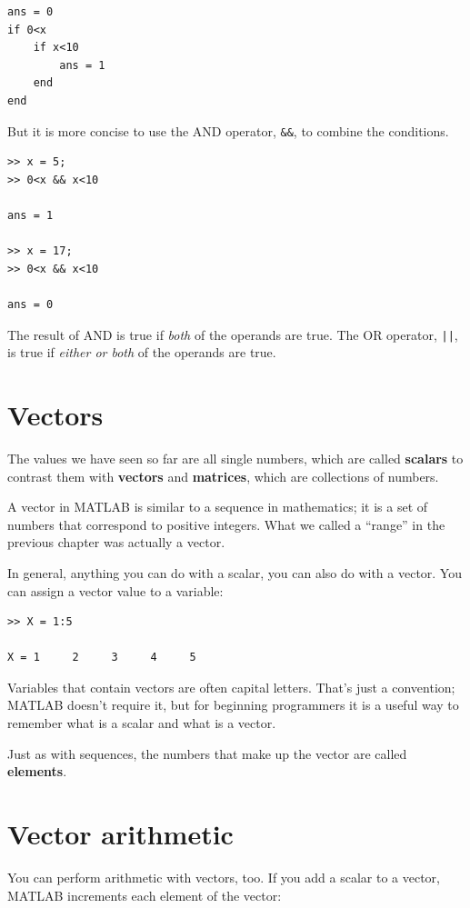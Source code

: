 \documentclass{book}
\begin{document}
\begin{verbatim}
ans = 0
if 0<x
    if x<10
        ans = 1
    end
end
\end{verbatim}

But it is more concise to use the AND operator, {\tt \&\&}, to
combine the conditions.

\begin{verbatim}
>> x = 5;
>> 0<x && x<10

ans = 1

>> x = 17;
>> 0<x && x<10

ans = 0
\end{verbatim}

The result of AND is true if {\em both} of the operands are
true.  The OR operator, {\tt ||}, is true if {\em either or both}
of the operands are true.


\section{Vectors}

The values we have seen so far are all single numbers,
which are called {\bf scalars} to contrast them with {\bf vectors}
and {\bf matrices}, which are collections of numbers.

A vector in MATLAB is similar to a sequence in mathematics;
it is a set of numbers that correspond to positive integers.  
What
we called a ``range'' in the previous chapter was actually a
vector.

In general, anything you can do with a scalar, you can also do with
a vector.  You can assign a vector value to a variable:

\begin{verbatim}
>> X = 1:5

X = 1     2     3     4     5
\end{verbatim}

Variables that contain vectors are often capital letters.  That's
just a convention; MATLAB doesn't require it, but for beginning
programmers it is a useful way to remember what is a scalar and
what is a vector.

Just as with sequences, the numbers that make up the vector are called
{\bf elements}.


\section{Vector arithmetic}

You can perform arithmetic with vectors, too.  If you add a scalar
to a vector, MATLAB increments each element of the vector:
\end{document}
